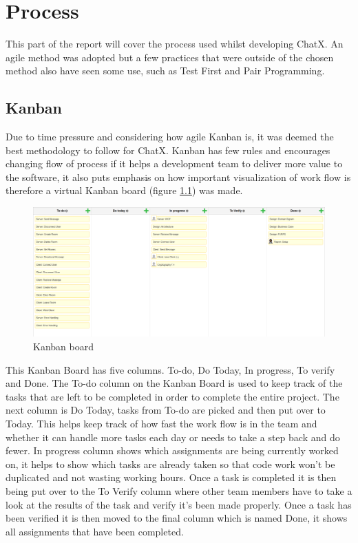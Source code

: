 \chapter{Process}
This part of the report will cover the process used whilst developing ChatX. An agile method was adopted but a few practices that were outside of the chosen method also have seen some use, such as Test First and Pair Programming.

\section{Kanban}
Due to time pressure and considering how agile Kanban is, it was deemed the best methodology to follow for ChatX. Kanban has few rules and encourages changing flow of process if it helps a development team to deliver more value to the software, it also puts emphasis on how important visualization of work flow is therefore a virtual Kanban board (figure \ref{fig:KanbanBoard}) was made.  %

\begin{figure}[H]
\centering
\includegraphics[width=0.7\linewidth]{"img/Kanban Board"}
\caption{Kanban board}
\label{fig:KanbanBoard}
\end{figure}

This Kanban Board has five columns. To-do, Do Today, In progress, To verify and Done. 
The To-do column on the Kanban Board is used to keep track of the tasks that are left to be completed in order to complete the entire project. The next column is Do Today, tasks from To-do are picked and then put over to Today. This helps keep track of how fast the work flow is in the team and whether it can handle more tasks each day or needs to take a step back and do fewer. In progress column shows which assignments are being currently worked on, it helps to show which tasks are already taken so that code work won't be duplicated and not wasting working hours. Once a task is completed it is then being put over to the To Verify column where other team members have to take a look at the results of the task and verify it's been made properly. Once a task has been verified it is then moved to the final column which is named Done, it shows all assignments that have been completed. %


